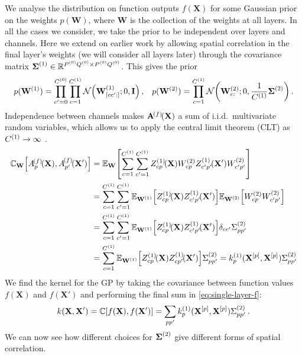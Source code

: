 \documentclass{article}
\theoremstyle{definition}
\newcommand{\vX}{\mathbf{X}}
\newcommand{\vW}{\mathbf{W}}
\newcommand{\eye}{\mathbf{I}}
\begin{document}
We analyse the distribution on function outputs $f(\vX)$ for some Gaussian prior on the weights $p(\vW)$, where $\vW$ is the collection of the weights at all layers. In all the cases we consider, we take the prior to be independent over layers and channels. Here we extend on earlier work by allowing spatial correlation in the final layer's weights (we will consider all layers later) through the covariance matrix $\boldsymbol{\Sigma}^{(1)} \in \mathbb{R}^{P^{(0)}Q^{(0)}\times P^{(0)}Q^{(0)}}$. This gives the prior
\begin{align}
    p(\layerW1) = \prod_{c'=0}^{\layerC0}\prod_{c=1}^{\layerC1}\NormDist{\layerW1_{[cc':]}; 0, \eye} \,,
    && p(\layerW2) = \prod_{c=1}^{\layerC1} \NormDist{\layerW2_{c:}; 0, \frac{1}{\layerC1}\priorWcov2} \,.
\end{align}
Independence between channels makes $\layerA{f}$ a sum of i.i.d.~multivariate random variables, which allows us to apply the central limit theorem (CLT) as $C^{(1)}\to\infty$ \citep{neal1996bayesian}.
\begin{align}
    \mathbb{C}_{\vW}\left[\layerAs{f}{p},\layerAsd{f}{p'}\right] &= \Exp{\vW}{\sum_{c=1}^{\layerC1}\sum_{c'=1}^{\layerC1} \layerNLAs{1}{cp}\layerWs{2}_{cp}\layerNLAsd{1}{c'p'}\layerWs{2}_{c'p'}} \nonumber \\
    &= \sum_{c=1}^{\layerC1}\sum_{c'=1}^{\layerC1} \Exp{\layerW1}{\layerNLAs{1}{cp}\layerNLAsd{1}{c'p'}}\Exp{\layerW2}{\layerWs{2}_{cp} \layerWs{2}_{c'p'}} \nonumber \\
    &= \sum_{c=1}^{\layerC1}\sum_{c'=1}^{\layerC1} \Exp{\layerW1}{\layerNLAs{1}{cp}\layerNLAsd{1}{c'p'}}\delta_{cc'}\priorWcovs{2}_{pp'} \nonumber \\
    &= \sum_{c=1}^{\layerC1} \Exp{\layerW1}{\layerNLAs{1}{cp}\layerNLAsd{1}{cp'}}\priorWcovs{2}_{pp'} = k^{(1)}_{p}(\vX^{[p]}, \vX^{[p]}) \priorWcovs{2}_{pp'}
\end{align}
We find the kernel for the GP by taking the covariance between function values $f(\vX)$ and $f(\vX')$ and performing the final sum in \cref{eq:single-layer-f}:
\begin{align}
    k(\vX, \vX') = \mathbb{C}\left[f(\vX), f(\vX')\right] = \sum_{pp'} k^{(1)}_{p}(\vX^{[p]}, \vX^{[p]}) \priorWcovs{2}_{pp'} \,.
\end{align}
We can now see how different choices for $\boldsymbol{\Sigma}^{(2)}$ give different forms of spatial correlation.
\end{document}
